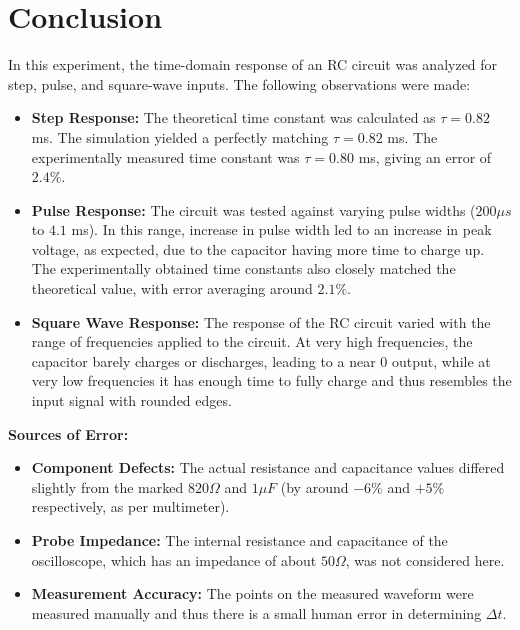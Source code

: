 \documentclass[12pt, a4paper]{article}
\begin{document}
\section{Conclusion}
In this experiment, the time-domain response of an RC circuit was analyzed for step, pulse, and square-wave inputs. The following observations were made:

\begin{itemize}
    \item \textbf{Step Response:} The theoretical time constant was calculated as $\tau = 0.82$ ms. The simulation yielded a perfectly matching $\tau = 0.82$ ms. The experimentally measured time constant was $\tau = 0.80$ ms, giving an error of $2.4\%$.

    \item \textbf{Pulse Response:} The circuit was tested against varying pulse widths ($200\mu s$ to $4.1$ ms). In this range, increase in pulse width led to an increase in peak voltage, as expected, due to the capacitor having more time to charge up. The experimentally obtained time constants also closely matched the theoretical value, with error averaging around $2.1\%$.

    \item \textbf{Square Wave Response:} The response of the RC circuit varied with the range of frequencies applied to the circuit. At very high frequencies, the capacitor barely charges or discharges, leading to a near 0 output, while at very low frequencies it has enough time to fully charge and thus resembles the input signal with rounded edges.
\end{itemize}

\noindent \textbf{Sources of Error:}
\begin{itemize}
    \item \textbf{Component Defects:} The actual resistance and capacitance values differed slightly from the marked $820\Omega$ and $1\mu F$ (by around $- 6\%$ and $+ 5\%$ respectively, as per multimeter).
    \item \textbf{Probe Impedance:} The internal resistance and capacitance of the oscilloscope, which has an impedance of about $50 \Omega$, was not considered here.
    \item \textbf{Measurement Accuracy:} The points on the measured waveform were measured manually and thus there is a small human error in determining $\Delta t$.
\end{itemize}
\end{document}
